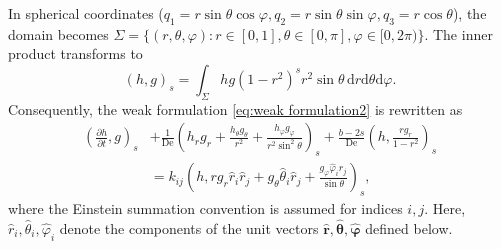 \documentclass[preprint,12pt]{elsarticle}
\begin{document}
In spherical coordinates ($q_1=r\sin\theta \cos\varphi, q_2=r\sin\theta \sin\varphi, q_3=r\cos\theta$), the domain becomes $\Sigma=\{(r,\theta,\varphi): r\in[0,1], \theta\in[0,\pi], \varphi\in[0,2\pi)\}$. The inner product transforms to
\begin{equation}
    \left(h,g\right)_s=\int_{\Sigma}hg(1-r^2)^s r^2\sin\theta \,\mathrm{d}r\mathrm{d}\theta \mathrm{d}\varphi.
\end{equation}
Consequently, the weak formulation \eqref{eq:weak formulation2} is rewritten as
\begin{equation}
\begin{aligned}
    \left(\frac{\partial h}{\partial t},g\right)_s &+\frac{1}{\mathrm{De}}\left(h_rg_r+\frac{h_{\theta}g_{\theta}}{r^2}+
    \frac{h_{\varphi}g_{\varphi}}{r^2\sin^2\theta}\right)_s+\frac{b-2s}{\mathrm{De}}\left(h,\frac{rg_r}{1-r^2}\right)_s\\
    &= k_{ij}\left(h, r g_r \hat{r}_i \hat{r}_j + g_{\theta}\hat{\theta}_i \hat{r}_j + \frac{g_{\varphi}\hat{\varphi}_i \hat{r}_j}{\sin\theta}\right)_s, \label{eq:weak formulation3}
\end{aligned}
\end{equation}
where the Einstein summation convention is assumed for indices $i,j$. Here, $\hat{r}_i, \hat{\theta}_i, \hat{\varphi}_i$ denote the components of the unit vectors $\hat{\bm{r}}, \hat{\bm{\theta}}, \hat{\bm{\varphi}}$ defined below.
\end{document}
